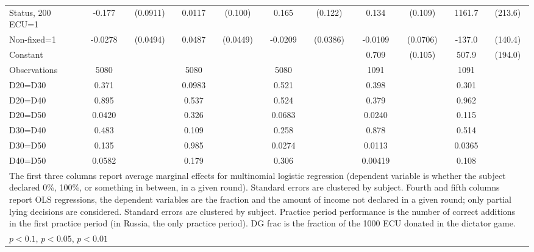 \begin{tabular}{l|cccccc|cc|cc}
Status, 200 ECU=1&   -0.177\sym{*}  & (0.0911)&   0.0117         &  (0.100)&    0.165         &  (0.122)&    0.134         &  (0.109)&   1161.7\sym{***}&  (213.6)\\
Non-fixed=1     &  -0.0278         & (0.0494)&   0.0487         & (0.0449)&  -0.0209         & (0.0386)&  -0.0109         & (0.0706)&   -137.0         &  (140.4)\\
Constant        &                  &         &                  &         &                  &         &    0.709\sym{***}&  (0.105)&    507.9\sym{***}&  (194.0)\\
\hline
Observations    &     5080         &         &     5080         &         &     5080         &         &     1091         &         &     1091         &         \\
D20=D30         &    0.371         &         &   0.0983         &         &    0.521         &         &    0.398         &         &    0.301         &         \\
D20=D40         &    0.895         &         &    0.537         &         &    0.524         &         &    0.379         &         &    0.962         &         \\
D20=D50         &   0.0420         &         &    0.326         &         &   0.0683         &         &   0.0240         &         &    0.115         &         \\
D30=D40         &    0.483         &         &    0.109         &         &    0.258         &         &    0.878         &         &    0.514         &         \\
D30=D50         &    0.135         &         &    0.985         &         &   0.0274         &         &   0.0113         &         &   0.0365         &         \\
D40=D50         &   0.0582         &         &    0.179         &         &    0.306         &         &  0.00419         &         &    0.108         &         \\
\hline\hline
\multicolumn{11}{p{18cm}}{\tiny The first three columns report average marginal effects for multinomial logistic regression (dependent variable is whether the subject declared 0\%,  100\%, or something in between, in a given round). Standard errors are clustered by subject. Fourth and fifth columns report OLS regressions, the dependent variables are the fraction and the amount of income not declared in a given round; only partial lying decisions are considered. Standard errors are clustered by subject. Practice period performance is the number of correct additions in the first practice period (in Russia, the only practice period). DG frac is the fraction of the 1000 ECU donated in the dictator game.}\\
\multicolumn{11}{l}{\tiny \sym{*} \(p<0.1\), \sym{**} \(p<0.05\), \sym{***} \(p<0.01\)}\\
\end{tabular}